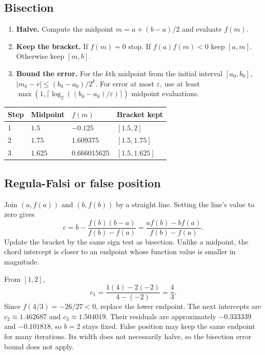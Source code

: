 \documentclass[12pt,a4paper]{article}
\begin{document}
\subsection{Bisection}
\begin{enumerate}[leftmargin=*, itemsep=3pt, topsep=4pt]
  \item \textbf{Halve.} Compute the midpoint $m=a+(b-a)/2$ and evaluate $f(m)$.
  \item \textbf{Keep the bracket.} If $f(m)=0$ stop. If $f(a)f(m)<0$ keep $[a,m]$. Otherwise keep $[m,b]$.
  \item \textbf{Bound the error.} For the $k$th midpoint from the initial interval $[a_0,b_0]$, $|m_k-r|\le(b_0-a_0)/2^k$. For error at most $\varepsilon$, use at least $\max(1,\lceil\log_2((b_0-a_0)/\varepsilon)\rceil)$ midpoint evaluations.
\end{enumerate}
\begin{tcolorbox}[examplebox, title={Bisection on the cubic}]
\par\vspace{5pt}
\begingroup
\setlength{\extrarowheight}{1pt}
\noindent\begin{tabularx}{\linewidth}{|B{1.25cm}|Y|Y|Y|}
\hline
\textbf{Step} & \textbf{Midpoint} & \textbf{$f(m)$} & \textbf{Bracket kept} \\  & $1.5$ & $-0.125$ & $[1.5,2]$ \\  & $1.75$ & $1.609375$ & $[1.5,1.75]$ \\  & $1.625$ & $0.666015625$ & $[1.5,1.625]$ \\ \hline
\end{tabularx}\par
\endgroup
\end{tcolorbox}

\subsection{Regula-Falsi or false position}
\begin{tcolorbox}[formulabox, title={Chord intercept}]
Join $(a,f(a))$ and $(b,f(b))$ by a straight line. Setting the line's value to zero gives
\[
c=b-\frac{f(b)(b-a)}{f(b)-f(a)}
 =\frac{a f(b)-b f(a)}{f(b)-f(a)}.
\]
Update the bracket by the same sign test as bisection. Unlike a midpoint, the chord intercept is closer to an endpoint whose function value is smaller in magnitude.
\end{tcolorbox}

\begin{tcolorbox}[examplebox, title={False-position iterations on the cubic}]
From $[1,2]$,
\[
c_1=\frac{1(4)-2(-2)}{4-(-2)}=\frac{4}{3}.
\]
Since $f(4/3)=-26/27<0$, replace the lower endpoint. The next intercepts are $c_2\approx1.462687$ and $c_3\approx1.504019$. Their residuals are approximately $-0.333339$ and $-0.101818$, so $b=2$ stays fixed. False position may keep the same endpoint for many iterations. Its width does not necessarily halve, so the bisection error bound does not apply.
\end{tcolorbox}
\end{document}
